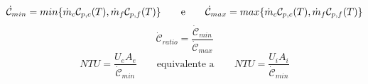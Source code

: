 \documentclass[a4paper,10pt]{article}                                                                                       %
\begin{document}
\begin{equation}                                                                                                            %
  \mathcal{\dot{C}}_{min} = min\{\dot{m}_c\mathcal{C}_{p,c}(T),\space\dot{m}_f\mathcal{C}_{p,f}(T)\}                        %
  \qquad\text{e}\qquad                                                                                                      %
  \mathcal{\dot{C}}_{max} = max\{\dot{m}_c\mathcal{C}_{p,c}(T),\space\dot{m}_f\mathcal{C}_{p,f}(T)\}                        %
  \label{eqn:cpt}                                                                                                           %
\end{equation}                                                                                                              %
\begin{equation}                                                                                                            %
  \mathcal{\dot{C}}_{ratio} = \frac{\mathcal{\dot{C}}_{min}}{\mathcal{\dot{C}}_{max}}                                       %
  \label{eqn:cpt_r}                                                                                                         %
\end{equation}                                                                                                              %
\begin{equation}                                                                                                            %
  NTU = \frac{U_eA_e}{\mathcal{\dot{C}}_{min}}                                                                              %
  \qquad\text{equivalente a}\qquad                                                                                          %
  NTU = \frac{U_iA_i}{\mathcal{\dot{C}}_{min}}                                                                              %
  \label{eqn:ntu}                                                                                                           %
\end{equation}                                                                                                              %
\end{document}
